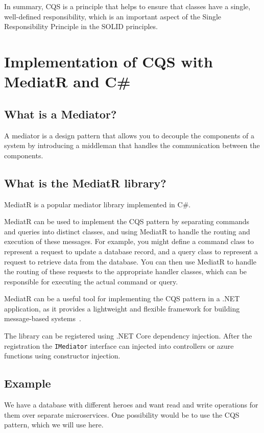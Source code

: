 \documentclass[11pt,conference]{IEEEtran}
\begin{document}
In summary, CQS is a principle that helps to ensure that classes have a single, well-defined responsibility, which is an important aspect of the Single Responsibility Principle in the SOLID principles.

\section{Implementation of CQS with MediatR and C\#}

\subsection{What is a Mediator?}

A mediator is a design pattern that allows you to decouple the components of a system by introducing a middleman that handles the communication between the components.

\subsection{What is the MediatR library?}

MediatR is a popular mediator library implemented in C\#.

MediatR can be used to implement the CQS pattern by separating commands and queries into distinct classes, and using MediatR to handle the routing and execution of these messages. For example, you might define a command class to represent a request to update a database record, and a query class to represent a request to retrieve data from the database. You can then use MediatR to handle the routing of these requests to the appropriate handler classes, which can be responsible for executing the actual command or query.

MediatR can be a useful tool for implementing the CQS pattern in a .NET application, as it provides a lightweight and flexible framework for building message-based systems~\cite{mediatr}.

The library can be registered using .NET Core dependency injection.
After the registration the \texttt{IMediator} interface can injected into controllers or azure functions using constructor injection.

\subsection{Example}

We have a database with different heroes and want read and write operations for them over separate microservices.
One possibility would be to use the CQS pattern, which we will use here.
\end{document}
